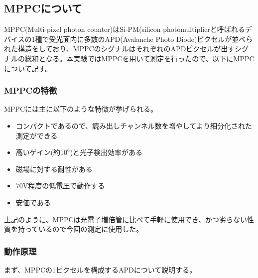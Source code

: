 \subsection{MPPCについて}
MPPC(Multi-pixel photon counter)はSi-PM(silicon photomultiplierと呼ばれるデバイスの1種で受光面内に多数のAPD(Avalanche Photo Diode)ピクセルが並べられた構造をしており、MPPCのシグナルはそれぞれのAPDピクセルが出すシグナルの総和となる。本実験ではMPPCを用いて測定を行ったので、以下にMPPCについて記す。
\subsubsection{MPPCの特徴}
MPPCには主に以下のような特徴が挙げられる。
\begin{itemize}
 \item コンパクトであるので、読み出しチャンネル数を増やしてより細分化された測定ができる
 \item 高いゲイン(約$10^6$)と光子検出効率がある
 \item 磁場に対する耐性がある
 \item 70V程度の低電圧で動作する
 \item 安価である
\end{itemize}
上記のように、MPPCは光電子増倍管に比べて手軽に使用でき、かつ劣らない性質を持っているので今回の測定に使用した。
\subsubsection{動作原理}
まず、MPPCの1ピクセルを構成するAPDについて説明する。

